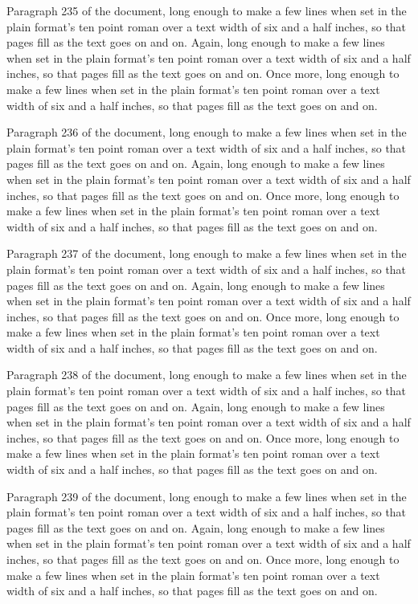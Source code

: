 Paragraph 235 of the document, long enough to make a few lines when set in the plain format's ten point roman over a text width of six and a half inches, so that pages fill as the text goes on and on. Again, long enough to make a few lines when set in the plain format's ten point roman over a text width of six and a half inches, so that pages fill as the text goes on and on. Once more, long enough to make a few lines when set in the plain format's ten point roman over a text width of six and a half inches, so that pages fill as the text goes on and on.

Paragraph 236 of the document, long enough to make a few lines when set in the plain format's ten point roman over a text width of six and a half inches, so that pages fill as the text goes on and on. Again, long enough to make a few lines when set in the plain format's ten point roman over a text width of six and a half inches, so that pages fill as the text goes on and on. Once more, long enough to make a few lines when set in the plain format's ten point roman over a text width of six and a half inches, so that pages fill as the text goes on and on.

Paragraph 237 of the document, long enough to make a few lines when set in the plain format's ten point roman over a text width of six and a half inches, so that pages fill as the text goes on and on. Again, long enough to make a few lines when set in the plain format's ten point roman over a text width of six and a half inches, so that pages fill as the text goes on and on. Once more, long enough to make a few lines when set in the plain format's ten point roman over a text width of six and a half inches, so that pages fill as the text goes on and on.

Paragraph 238 of the document, long enough to make a few lines when set in the plain format's ten point roman over a text width of six and a half inches, so that pages fill as the text goes on and on. Again, long enough to make a few lines when set in the plain format's ten point roman over a text width of six and a half inches, so that pages fill as the text goes on and on. Once more, long enough to make a few lines when set in the plain format's ten point roman over a text width of six and a half inches, so that pages fill as the text goes on and on.

Paragraph 239 of the document, long enough to make a few lines when set in the plain format's ten point roman over a text width of six and a half inches, so that pages fill as the text goes on and on. Again, long enough to make a few lines when set in the plain format's ten point roman over a text width of six and a half inches, so that pages fill as the text goes on and on. Once more, long enough to make a few lines when set in the plain format's ten point roman over a text width of six and a half inches, so that pages fill as the text goes on and on.

